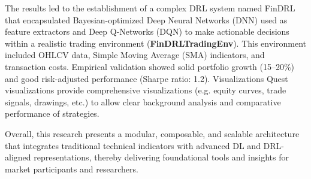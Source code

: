 The results led to the establishment of a complex DRL system named FinDRL that encapsulated Bayesian-optimized Deep Neural Networks (DNN) used as feature extractors and Deep Q-Networks (DQN) to make actionable decisions within a realistic trading environment (\textbf{FinDRLTradingEnv}). This environment included OHLCV data, Simple Moving Average (SMA) indicators, and transaction costs. Empirical validation showed solid portfolio growth (15–20\%) and good risk-adjusted performance (Sharpe ratio: 1.2). Visualizations Quest visualizations provide comprehensive visualizations (e.g. equity curves, trade signals, drawings, etc.) to allow clear background analysis and comparative performance of strategies.

Overall, this research presents a modular, composable, and scalable architecture that integrates traditional technical indicators with advanced DL and DRL-aligned representations, thereby delivering foundational tools and insights for market participants and researchers.